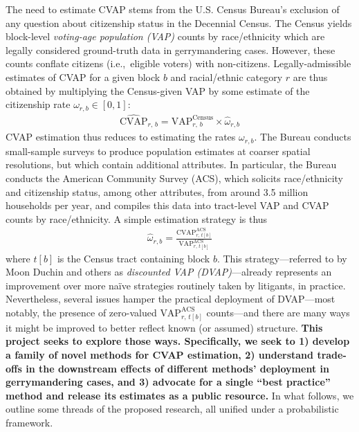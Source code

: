 \documentclass[11pt]{article}
\begin{document}
The need to estimate CVAP stems from the U.S. Census Bureau's exclusion of any question about citizenship status in the Decennial Census. The Census yields block-level \textit{voting-age population (VAP)} counts by race/ethnicity which are legally considered ground-truth data in gerrymandering cases. However, these counts conflate citizens (i.e.,~eligible voters) with non-citizens. Legally-admissible estimates of CVAP for a given block $b$ and racial/ethnic category $r$ are thus obtained by multiplying the Census-given VAP by some estimate of the citizenship rate $\omega_{r,b} \in [0,1]$:
\begin{align} 
\widehat{\textrm{CVAP}}_{r,\,b}  = \textrm{VAP}^{\textrm{Census}}_{r,\,b}  \times \widehat{\omega}_{r,b}
\end{align}
CVAP estimation thus reduces to estimating the rates $\omega_{r,b}$. The Bureau conducts small-sample surveys to produce population estimates at coarser spatial resolutions, but which contain additional attributes. In particular, the Bureau conducts the American Community Survey (ACS), which solicits race/ethnicity and citizenship status, among other attributes, from around 3.5 million households per year, and compiles this data into tract-level VAP and CVAP counts by race/ethnicity. A simple estimation strategy is thus
\begin{align} 
\label{eq:dvap}
\widehat{\omega}_{r,b} = \tfrac{\textrm{CVAP}^{\textrm{ACS}}_{r,\,t[b]}}{\textrm{VAP}^{\textrm{ACS}}_{r,\,t[b]}}
\end{align}
where $t[b]$ is the Census tract containing block $b$. This strategy---referred to by Moon Duchin and others as \textit{discounted VAP (DVAP)}---already represents an improvement over more na\"ive strategies routinely taken by litigants, in practice. Nevertheless, several issues hamper the practical deployment of DVAP---most notably, the presence of zero-valued $\textrm{VAP}^{\textrm{ACS}}_{r,\,t[b]}$ counts---and there are many ways it might be improved to better reflect known (or assumed) structure. \textbf{This project seeks to explore those ways. Specifically, we seek to 1) develop a family of novel methods for CVAP estimation, 2) understand trade-offs in the downstream effects of different methods' deployment in gerrymandering cases, and 3) advocate for a single ``best practice'' method and release its estimates as a public resource.} In what follows, we outline some threads of the proposed research, all unified under a probabilistic framework. 
\end{document}
